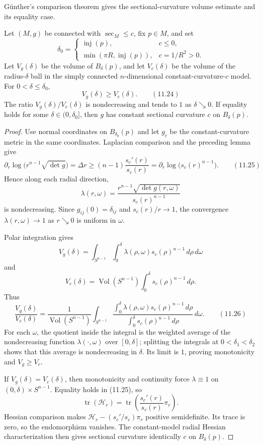 G\"unther's comparison theorem \cite{Gun60} gives the sectional-curvature
volume estimate and its equality case.

\begin{theorem}
\label{thm:gunther-volume-comparison}
Let $(M,g)$ be connected with $\sec_M\leq c$, fix $p\in M$, and set
\[
\delta_0=
\begin{cases}
\operatorname{inj}(p),&c\leq0,\\
\min(\pi R,\operatorname{inj}(p)),&c=1/R^2>0.
\end{cases}
\]
Let $V_g(\delta)$ be the volume of $B_\delta(p)$, and let $V_c(\delta)$ be the
volume of the radius-$\delta$ ball in the simply connected $n$-dimensional
constant-curvature-$c$ model. For $0<\delta\leq\delta_0$,
\[
V_g(\delta)\geq V_c(\delta). \qquad (11.24)
\]
The ratio $V_g(\delta)/V_c(\delta)$ is nondecreasing and tends to $1$ as
$\delta\searrow0$. If equality holds for some
$\delta\in(0,\delta_0]$, then $g$ has constant sectional curvature $c$ on
$B_\delta(p)$.

\begin{proof}
\sketch Use normal coordinates on $B_{\delta_0}(p)$ and let $g_c$ be the
constant-curvature metric in the same coordinates. Laplacian comparison and
the preceding lemma give
\[
\partial_r\log\bigl(r^{n-1}\sqrt{\det g}\bigr)
=\Delta r
\geq(n-1)\frac{s_c'(r)}{s_c(r)}
=\partial_r\log\bigl(s_c(r)^{n-1}\bigr).
\qquad (11.25)
\]
Hence along each radial direction,
\[
\lambda(r,\omega)
=\frac{r^{n-1}\sqrt{\det g(r,\omega)}}{s_c(r)^{n-1}}
\]
is nondecreasing. Since $g_{ij}(0)=\delta_{ij}$ and $s_c(r)/r\to1$, the
convergence $\lambda(r,\omega)\to1$ as $r\searrow0$ is uniform in $\omega$.

Polar integration gives
\[
V_g(\delta)
=\int_{S^{n-1}}\int_0^\delta
\lambda(\rho,\omega)s_c(\rho)^{n-1}\,d\rho\,d\omega
\]
and
\[
V_c(\delta)
=\operatorname{Vol}(S^{n-1})
  \int_0^\delta s_c(\rho)^{n-1}\,d\rho.
\]
Thus
\[
\frac{V_g(\delta)}{V_c(\delta)}
=\frac1{\operatorname{Vol}(S^{n-1})}
\int_{S^{n-1}}
\frac{\int_0^\delta
\lambda(\rho,\omega)s_c(\rho)^{n-1}\,d\rho}
{\int_0^\delta s_c(\rho)^{n-1}\,d\rho}
\,d\omega.
\qquad (11.26)
\]
For each $\omega$, the quotient inside the integral is the weighted average of
the nondecreasing function $\lambda(\cdot,\omega)$ over $[0,\delta]$; splitting
the integrals at $0<\delta_1<\delta_2$ shows that this average is
nondecreasing in $\delta$. Its limit is $1$, proving monotonicity and
$V_g\geq V_c$.

If $V_g(\delta)=V_c(\delta)$, then monotonicity and continuity force
$\lambda\equiv1$ on $(0,\delta)\times S^{n-1}$. Equality holds in (11.25), so
\[
\operatorname{tr}(\mathcal H_r)
=\operatorname{tr}\left(\frac{s_c'(r)}{s_c(r)}\pi_r\right).
\]
Hessian comparison makes
$\mathcal H_r-(s_c'/s_c)\pi_r$ positive semidefinite. Its trace is zero, so
the endomorphism vanishes. The constant-model radial Hessian characterization
then gives sectional curvature identically $c$ on $B_\delta(p)$.
\end{proof}
\end{theorem}
